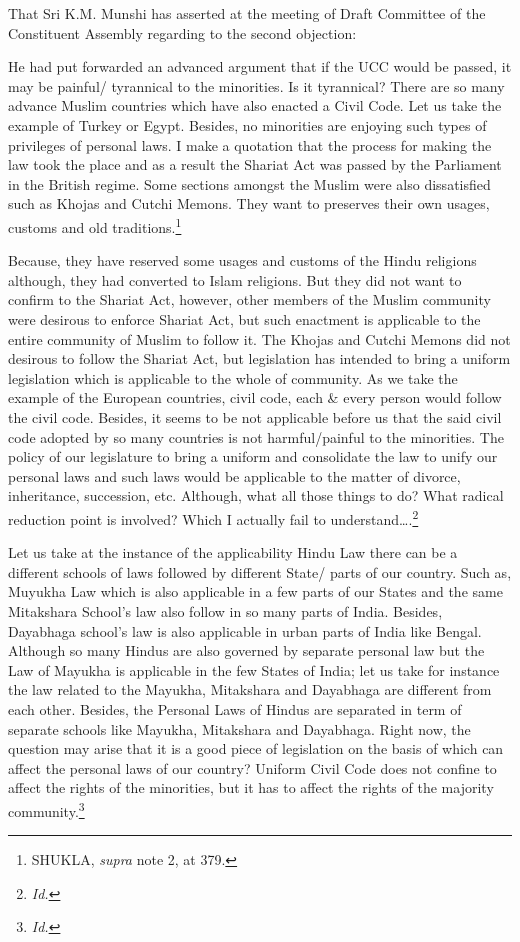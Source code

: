 \begin{multicols}{2}
That Sri K.M. Munshi has asserted at the meeting of Draft Committee of the Constituent
Assembly regarding to the second objection: 

He had put forwarded an advanced argument that if the UCC would be passed, it may be
painful/ tyrannical to the minorities. Is it tyrannical? There are so many advance Muslim
countries which have also enacted a Civil Code. Let us take the example of Turkey or Egypt.
Besides, no minorities are enjoying such types of privileges of personal laws. I make a
quotation that the process for making the law took the place and as a result the Shariat Act
was passed by the Parliament in the British regime. Some sections amongst the Muslim were
also dissatisfied such as Khojas and Cutchi Memons. They want to preserves their own
usages, customs and old traditions.\footnote{SHUKLA, {\it supra} note 2, at 379.}

Because, they have reserved some usages and customs of the Hindu religions although, they
had converted to Islam religions. But they did not want to confirm to the Shariat Act,
however, other members of the Muslim community were desirous to enforce Shariat Act, but
such enactment is applicable to the entire community of Muslim to follow it. The Khojas and
Cutchi Memons did not desirous to follow the Shariat Act, but legislation has intended to
bring a uniform legislation which is applicable to the whole of community. As we take the
example of the European countries, civil code, each \& every person would follow the civil
code. Besides, it seems to be not applicable before us that the said civil code adopted by so
many countries is not harmful/painful to the minorities. The policy of our legislature to bring
a uniform and consolidate the law to unify our personal laws and such laws would be
applicable to the matter of divorce, inheritance, succession, etc. Although, what all those things to do? What radical reduction point is involved? Which I actually fail to
understand….\footnote{\it Id.} 

Let us take at the instance of the applicability Hindu Law there can be a different schools of
laws followed by different State/ parts of our country. Such as, Muyukha Law which is also
applicable in a few parts of our States and the same Mitakshara School’s law also follow in
so many parts of India. Besides, Dayabhaga school’s law is also applicable in urban parts of
India like Bengal. Although so many Hindus are also governed by separate personal law but
the Law of Mayukha is applicable in the few States of India; let us take for instance the law
related to the Mayukha, Mitakshara and Dayabhaga are different from each other. Besides,
the Personal Laws of Hindus are separated in term of separate schools like Mayukha,
Mitakshara and Dayabhaga. Right now, the question may arise that it is a good piece of
legislation on the basis of which can affect the personal laws of our country? Uniform Civil
Code does not confine to affect the rights of the minorities, but it has to affect the rights of
the majority community.\footnote{\it Id.}


\end{multicols}
